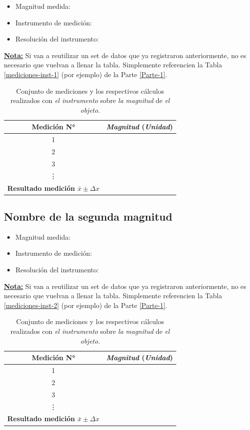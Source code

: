 \documentclass[12pt,a4paper]{article}
\begin{document}
\begin{itemize}
    \item Magnitud medida:
    \item Instrumento de medición:
    \item Resolución del instrumento:
\end{itemize}

\underline{\textbf{Nota:}} Si van a reutilizar un set de datos que ya registraron anteriormente, no es necesario que vuelvan a llenar la tabla. Simplemente referencien la Tabla \ref{mediciones-inst-1} (por ejemplo) de la Parte \ref{Parte-1}.

\begin{table}[h!]
\centering
\begin{tabular}{|c|c|}
\hline
\textbf{Medición N°} & \textit{Magnitud} \textbf{(}\textit{Unidad}\textbf{)} \\ \hline
1 & \\ \hline
2 & \\ \hline
3 & \\ \hline
\vdots & \\ \hline
\textbf{Resultado medición $\bar{x} \pm \Delta x$} & \\ \hline
\end{tabular}
\caption{Conjunto de mediciones y los respectivos cálculos realizados con \textit{el instrumento} sobre \textit{la magnitud} de \textit{el objeto}.}
\label{mediciones-magn-1}
\end{table}

\subsection{Nombre de la segunda magnitud}

\begin{itemize}
    \item Magnitud medida:
    \item Instrumento de medición:
    \item Resolución del instrumento:
\end{itemize}

\underline{\textbf{Nota:}} Si van a reutilizar un set de datos que ya registraron anteriormente, no es necesario que vuelvan a llenar la tabla. Simplemente referencien la Tabla \ref{mediciones-inst-2} (por ejemplo) de la Parte \ref{Parte-1}.

\begin{table}[h!]
\centering
\begin{tabular}{|c|c|}
\hline
\textbf{Medición N°} & \textit{Magnitud} \textbf{(}\textit{Unidad}\textbf{)} \\ \hline
1 & \\ \hline
2 & \\ \hline
3 & \\ \hline
\vdots & \\ \hline
\textbf{Resultado medición $\bar{x} \pm \Delta x$} & \\ \hline
\end{tabular}
\caption{Conjunto de mediciones y los respectivos cálculos realizados con \textit{el instrumento} sobre \textit{la magnitud} de \textit{el objeto}.}
\label{mediciones-magn-2}
\end{table}
\end{document}
